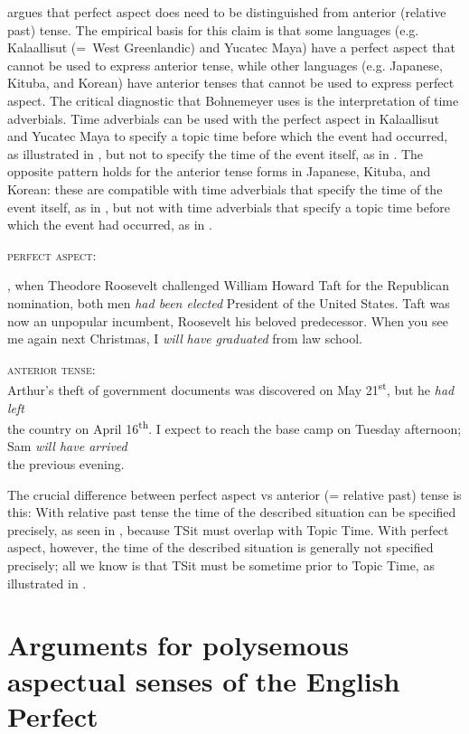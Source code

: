 \citet{Bohnemeyer2014} argues that perfect aspect does need to be distinguished from anterior (relative past) tense. The empirical basis for this claim is that some languages (e.g. Kalaallisut (=~West Greenlandic) and Yucatec Maya) have a perfect aspect that cannot be used to express anterior tense, while other languages (e.g. Japanese, Kituba, and Korean) have anterior tenses that cannot be used to express perfect aspect. The critical diagnostic that Bohnemeyer uses is the interpretation of time adverbials. Time adverbials can be used with the perfect aspect in Kalaallisut and Yucatec Maya to specify a topic time before which the event had occurred, as illustrated in , but not to specify the time of the event itself, as in . The opposite pattern holds for the anterior tense forms in Japanese, Kituba, and Korean: these are compatible with time adverbials that specify the time of the event itself, as in , but not with time adverbials that specify a topic time before which the event had occurred, as in .


\ea
\textsc{perfect aspect:}
\z

\ea
{}, when Theodore Roosevelt challenged William Howard Taft for the Republican nomination, both men \textit{had been elected} President of the United States. Taft was now an unpopular incumbent, Roosevelt his beloved predecessor.
\ex  When you see me again next Christmas, I \textit{will} \textit{have} \textit{graduated} from law school.
\z
\z 

\ea
\textsc{anterior tense:}\\
\ea  Arthur’s theft of government documents was discovered on May 21\textsuperscript{st}, but he \textit{had left} \\
the country on April 16\textsuperscript{th}.
\ex  I expect to reach the base camp on Tuesday afternoon; Sam \textit{will have arrived} \\
the previous evening.
\z \z


The crucial difference between perfect aspect vs anterior (= relative past) tense is this: With relative past tense the time of the described situation can be specified precisely, as seen in , because TSit must overlap with Topic Time. With perfect aspect, however, the time of the described situation is generally not specified precisely; all we know is that TSit must be sometime prior to Topic Time, as illustrated in .


\section{Arguments for polysemous aspectual senses of the English Perfect}\label{sec:} %

